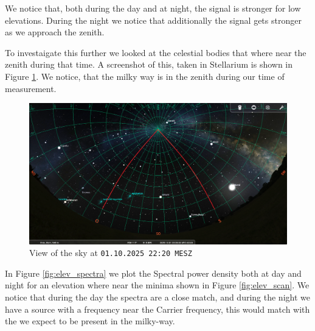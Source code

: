 We notice that, both during the day and at night, the signal is stronger for low elevations. During the night we notice that additionally the signal gets stronger as we approach the zenith.

To investaigate this further we looked at the celestial bodies that where near the zenith during that time. A screenshot of this, taken in Stellarium is shown in Figure \ref{fig:stellarium}. We notice, that the milky way is in the zenith during our time of measurement.

\begin{figure}[ht]
    \centering
    \includegraphics[width=0.6\linewidth]{assets/ElevationScan_Az90_Az180_251001_2220MESZ.png}
    \caption{View of the sky at \texttt{01.10.2025 22:20 MESZ}}
    \label{fig:stellarium}
\end{figure}

In Figure \ref{fig:elev_spectra} we plot the Spectral power density both at day and night for an elevation where near the minima shown in Figure \ref{fig:elev_scan}. We notice that during the day the spectra are a close match, and during the night we have a source with a frequency near the Carrier frequency, this would match with the  we expect to be present in the milky-way.

